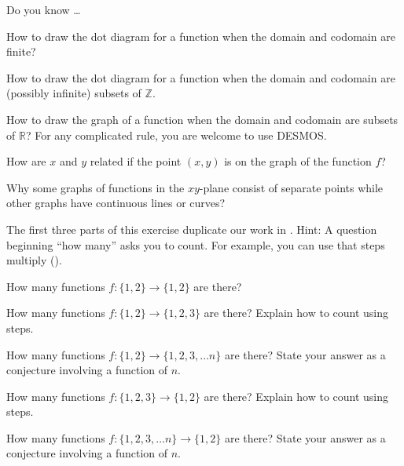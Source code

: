 \begin{exer}[\exerR] %
\label{exer_dyk_fn_dot_graphs}
    Do you know \ldots
        \begin{exerpart}
            \item How to draw the dot diagram for a function when the domain and codomain are finite?
            \item How to draw the dot diagram for a function when the domain and codomain are (possibly infinite) subsets of $\mathbb{Z}$.
            \item How to draw the graph of a function when the domain and codomain are subsets of $\mathbb{R}$?  For any complicated rule, you are welcome to use DESMOS\texttrademark.
            \item How are $x$ and $y$ related if the point $(x,y)$ is on the graph of the function $f$?
            \item Why some graphs of functions in the $xy$-plane consist of separate points while other graphs have continuous lines or curves?  
        \end{exerpart}
\end{exer}

\begin{exer}[\exerE] %
\label{exer_count_functions_finite}
    The first three parts of this exercise duplicate our work in .  Hint:  A question beginning ``how many'' asks you to count.  For example, you can use that steps multiply ().
    \begin{exerpart}
        \item How many functions $f:\{1,2\} \to \{1,2\}$ are there? 
        \item How many functions $f:\{1,2\} \to \{1,2,3\}$ are there? Explain how to count using steps.
        \item How many functions $f:\{1,2\} \to \{1,2,3, \ldots n\}$ are there? State your answer as a conjecture involving a function of $n$.         
        \item How many functions $f:\{1,2,3\} \to \{1,2\}$ are there? Explain how to count using steps.
        \item How many functions $f:\{1,2,3, \ldots n\} \to \{1,2\}$ are there? State your answer as a conjecture involving a function of $n$. 
    \end{exerpart}     
\end{exer}

